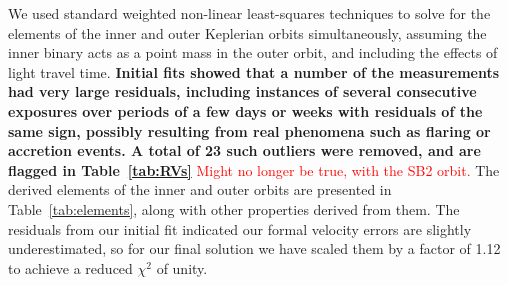 \documentclass[twocolumn]{aastex61}
\newcommand{\todo}[1]{ \textcolor{red}{#1}}
\begin{document}
We used standard weighted non-linear least-squares techniques \citep[e.g.,][]{press92} to solve for the elements of the inner and outer Keplerian orbits simultaneously, assuming the inner binary acts as a point mass in the outer orbit, and including the effects of light travel time. \textbf{Initial fits showed that a number of the measurements had very large residuals, including instances of several consecutive exposures over periods of a few days or weeks with residuals of the same sign, possibly resulting from real phenomena such as flaring or accretion events. A total of 23 such outliers were removed, and are flagged in Table~\ref{tab:RVs}} \todo{Might no longer be true, with the SB2 orbit.} The derived elements of the inner and outer orbits are presented in Table~\ref{tab:elements}, along with other properties derived from them. The residuals from our initial fit indicated our formal velocity errors are slightly underestimated, so for our final solution we have scaled them by a factor of 1.12 to achieve a reduced $\chi^2$ of unity.
\end{document}
